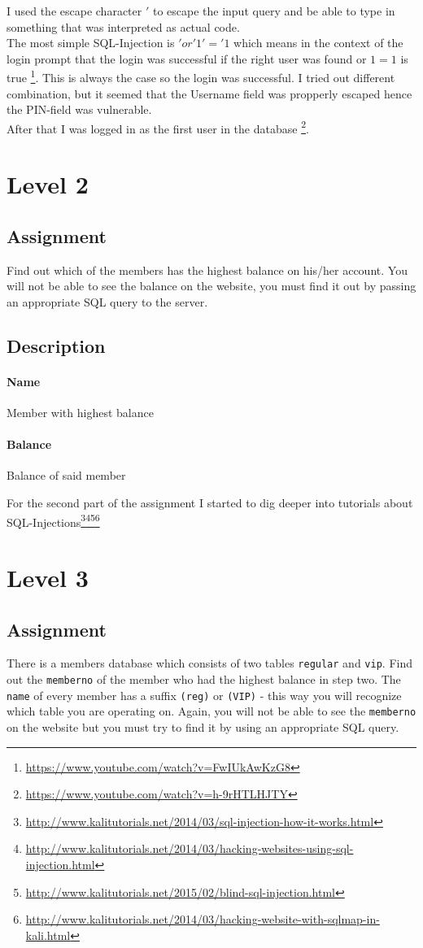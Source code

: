 \documentclass{scrartcl}
\newcommand\solution[2]{{\paragraph{#1}#2}}
\begin{document}
I used the escape character $'$ to escape the input query and be able to type in something that was interpreted as actual code. \\
The most simple SQL-Injection is $ ' or '1' = '1 $ which means in the context of the login prompt that the login was successful if the right user was found or $1=1$ is true \footnote{\url{https://www.youtube.com/watch?v=FwIUkAwKzG8}}. This is always the case so the login was successful. I tried out different combination, but it seemed that the Username field was propperly escaped hence the PIN-field was vulnerable.\\
After that I was logged in as the first user in the  database \footnote{\url{https://www.youtube.com/watch?v=h-9rHTLHJTY}}.

\section*{Level 2}
\subsection*{Assignment}
Find out which of the members has the highest balance on his/her account. You will not be able to see the balance on the website, you must find it out by passing an appropriate SQL query to the server.

\subsection*{Description}
\solution{Name}{Member with highest balance}
\solution{Balance}{Balance of said member}

For the second part of the assignment I started to dig deeper into tutorials about SQL-Injections\footnote{\url{http://www.kalitutorials.net/2014/03/sql-injection-how-it-works.html}}\footnote{\url{http://www.kalitutorials.net/2014/03/hacking-websites-using-sql-injection.html}}\footnote{\url{http://www.kalitutorials.net/2015/02/blind-sql-injection.html}}\footnote{\url{http://www.kalitutorials.net/2014/03/hacking-website-with-sqlmap-in-kali.html}}

\section*{Level 3}
\subsection*{Assignment}
There is a members database which consists of two tables \texttt{regular} and
\texttt{vip}. Find out the \texttt{memberno} of the member who had the highest
balance in step two. The \texttt{name} of every member has a suffix
\texttt{(reg)} or \texttt{(VIP)} - this way you will recognize which table you are operating on. Again, you will
not be able to see the \texttt{memberno} on the website but you must try to find it by
using an appropriate SQL query.
\end{document}
